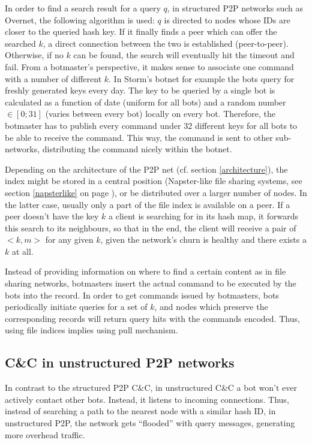 \documentclass{llncs}
\begin{document}
In order to find a search result for a query $q$, in structured P2P
networks such as Overnet, the following algorithm is used: $q$ is
directed to nodes whose IDs are closer to the queried hash key. If it
finally finds a peer which can offer the searched $k$, a direct
connection between the two is established (peer-to-peer). Otherwise,
if no $k$ can be found, the search will eventually hit the timeout and
fail. From a botmaster's perspective, it makes sense to associate one
command with a number of different $k$. In Storm's botnet for example
the bots query for freshly generated keys every
day.\cite{wang2009systematic} The key to be queried by a single bot is
calculated as a function of date (uniform for all bots) and a random
number $\in [0;31]$ (varies between every bot) locally on every
bot. Therefore, the botmaster has to publish every command under 32
different keys for all bots to be able to receive the command. This
way, the command is sent to other sub-networks, distributing the
command nicely within the botnet.

Depending on the architecture of the P2P net (cf. section \ref{architecture}),
the index might be stored in a central position (Napster-like file
sharing systems, see section \ref{napsterlike} on page
), or be distributed over a larger number of
nodes.  In the latter case, usually only a part of the file index is
available on a peer. If a peer doesn't have the key $k$ a client is
searching for in its hash map, it forwards this search to its
neighbours, so that in the end, the client will receive a pair of $<k,
m>$ for any given $k$, given the network's churn is healthy and there
exists a $k$ at all.

Instead of providing information on where to find a certain content as
in file sharing networks, botmasters insert the actual command to be
executed by the bots into the record.  In order to get commands issued
by botmasters, bots periodically initiate queries for a set of $k$,
and nodes which preserve the corresponding records will return query
hits with the commands encoded. Thus, using file indices implies using
pull mechanism. \cite{liang2006index}

\subsection{C\&C in unstructured P2P networks}
In contrast to the structured P2P C\&C, in unstructured C\&C a bot
won't ever actively contact other bots. Instead, it listens to
incoming connections.  \cite{li2009botnet} Thus, instead of searching
a path to the nearest node with a similar hash ID, in unstructured
P2P, the network gets ``flooded'' with query messages, generating more
overhead traffic.
\end{document}
